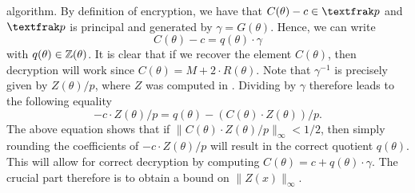 \begin{paralgorithm}{ algorithm.}
	By definition of encryption, we have that $C(\theta)-c \in \tfr{p}$ and $\tfr{p}$ is principal and generated by $\gamma = G(\theta)$.
	Hence, we can write
	\[
	C(\theta)-c = q(\theta) \cdot \gamma
	\]
	with $q(\theta) \in \mathbb{Z}(\theta)$. It is clear that if we recover the element $C(\theta)$, then decryption will work since $C(\theta) = M+2 \cdot R(\theta)$.
	Note that $\gamma^{-1}$ is precisely given by $Z(\theta)/p$, where $Z$ was computed in .
	Dividing by $\gamma$ therefore leads to the following equality
	\[
	-c \cdot Z(\theta)/p = q(\theta) - (C(\theta) \cdot Z(\theta))/p.
	\]
	The above equation shows that if $\| C(\theta) \cdot Z(\theta)/p \|_\infty < 1/2$, then simply rounding the coefficients of $-c \cdot Z(\theta)/p$ will result in the correct quotient $q(\theta)$.
	This will allow for correct decryption by computing $C(\theta) = c+q(\theta) \cdot \gamma$.
	The crucial part therefore is to obtain a bound on $\| Z(x) \|_\infty$.
\end{paralgorithm}

